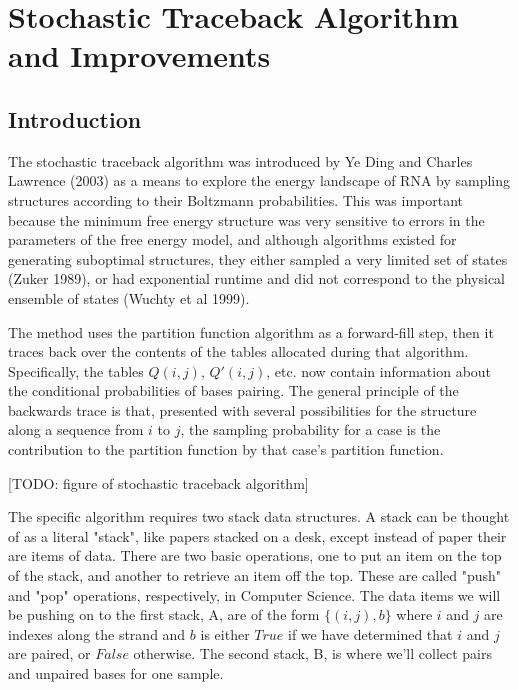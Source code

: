 \chapter{Stochastic Traceback Algorithm and Improvements}
\section{Introduction}

The stochastic traceback algorithm was introduced by Ye Ding and
Charles Lawrence (2003) as a means to explore the energy landscape of
RNA by sampling structures according to their Boltzmann
probabilities. This was important because the minimum free energy
structure was very sensitive to errors in the parameters of the free
energy model, and although algorithms existed for generating
suboptimal structures, they either sampled a very limited set of
states (Zuker 1989), or had exponential runtime and did not correspond
to the physical ensemble of states (Wuchty et al 1999).

The method uses the partition function algorithm as a forward-fill
step, then it traces back over the contents of the tables allocated
during that algorithm. Specifically, the tables $Q(i,j)$, $Q'(i,j)$,
etc. now contain information about the conditional probabilities of
bases pairing. The general principle of the backwards trace is that,
presented with several possibilities for the structure along a
sequence from $i$ to $j$, the sampling probability for a case is the
contribution to the partition function by that case's partition
function. 

[TODO: figure of stochastic traceback algorithm]

The specific algorithm requires two stack data structures. A stack can
be thought of as a literal "stack", like papers stacked on a desk,
except instead of paper their are items of data. There are two basic
operations, one to put an item on the top of the stack, and another to
retrieve an item off the top. These are called "push" and "pop"
operations, respectively, in Computer Science. The data items we will
be pushing on to the first stack, A, are of the form $\{(i,j), b\}$
where $i$ and $j$ are indexes along the strand and $b$ is either
$True$ if we have determined that $i$ and $j$ are paired, or $False$
otherwise. The second stack, B, is where we'll collect pairs and
unpaired bases for one sample.

